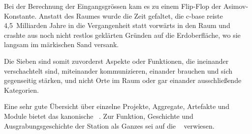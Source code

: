 \begin{newstuff}
{    Bei der Berechnung der Eingangsgrössen kam es zu einem Flip-Flop der Asi\-mov-Konstante. Anstatt des Raumes wurde die Zeit gefaltet, die c-base reiste 4,5~Milliarden Jahre in die Vergangenheit statt vorwärts in den Raum und crashte aus noch nicht restlos geklärten Gründen auf die Erdoberfläche, wo sie langsam im märkischen Sand versank. 
    }


    Die Sieben  sind somit zuvorderst Aspekte oder Funktionen, die ineinander verschachtelt sind, miteinander kommunizieren, einander brauchen und sich gegenseitig stärken, und nicht Orte im Raum oder gar einander ausschließende Kategorien.
    
    Eine sehr gute Übersicht über einzelne Projekte, Aggregate, Artefakte und Module bietet das kanonische ~\cite{cbasebook}. Zur Funktion, Geschichte und Ausgrabungsgeschichte der Station als Ganzes sei auf die ~\cite{cbasepressemap} verwiesen.
\end{newstuff}